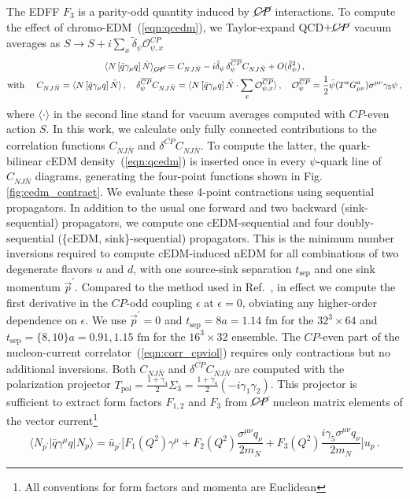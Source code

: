 \documentclass{PoS}
\newcommand{\CP}{{CP}}
\newcommand{\CPbar}{{\overline{CP}}}
\newcommand{\CPviol}{{\cancel{CP}}}
\newcommand{\mcO}{{\mathcal O}}
\begin{document}
The EDFF $F_3$ is a parity-odd quantity induced by $\CPviol$ interactions.
To compute the effect of chromo-EDM~(\ref{eqn:qcedm}), we Taylor-expand QCD$+\CPviol$ 
vacuum averages as
$S\to S + i\sum_x \tilde\delta_\psi \mcO^{\CPbar}_{\psi,x}$
\begin{gather}
\label{eqn:corr_cpviol}
\langle N\,[\bar q \gamma_\mu q]\, \bar N \rangle_{\CPviol}
  = C_{NJ\bar N} - i\tilde\delta_\psi \,\delta_\psi^\CPbar C_{NJ\bar N}
    + O(\tilde\delta_\psi^2)\,,
\\
\nonumber
\text{with }\quad
C_{NJ\bar N} = \langle N\,[\bar q \gamma_\mu q]\, \bar N\rangle\,,
\quad \delta_\psi^\CPbar C_{NJ\bar N} 
= \langle N\,[\bar q \gamma_\mu q]\, \bar{N} \cdot \sum_x\mcO^{\CPbar}_{\psi,x} \rangle\,,
\quad
\mcO_\psi^{\CPbar}  = \frac12\bar\psi (T^aG^a_{\mu\nu})\sigma^{\mu\nu}\gamma_5\psi\,,
\end{gather}
where $\langle\cdot\rangle$ in the second line stand for vacuum averages computed 
with $\CP$-even action $S$.
In this work, we calculate only fully connected contributions to the correlation 
functions $C_{N J \bar N}$ and $\delta^{\CPbar} C_{N J\bar N}$.
To compute the latter, the quark-bilinear cEDM density~(\ref{eqn:qcedm}) is inserted 
once in every $\psi$-quark line of $C_{N J\bar N}$ diagrams, generating the four-point functions 
shown in Fig.\ref{fig:cedm_contract}.
We evaluate these 4-point contractions using sequential propagators.
In addition to the usual one forward and two backward (sink-sequential) propagators, we compute 
one cEDM-sequential and four doubly-sequential (\{cEDM, sink\}-sequential) propagators.
This is the minimum number inversions required to compute cEDM-induced nEDM for all combinations 
of two degenerate flavors $u$ and $d$, with one source-sink separation $t_\text{sep}$ 
and one sink momentum $\vec p^\prime$. 
Compared to the method used in Ref.~\cite{Bhattacharya:2016oqm}, in effect we compute the first 
derivative in the $\CP$-odd coupling $\epsilon$ at $\epsilon=0$, obviating any higher-order 
dependence on $\epsilon$.
We use $\vec p^\prime=0$ and $t_\text{sep}=8a=1.14\text{ fm}$ for the $32^3\times64$ and
$t_\text{sep}=\{8,10\}a=0.91,1.15\text{ fm}$ for the $16^3\times32$ ensemble.
The $\CP$-even part of the nucleon-current correlator~(\ref{eqn:corr_cpviol})
requires only contractions but no additional inversions.
Both $C_{NJ\bar N}$ and $\delta^{\CPbar}C_{NJ\bar N}$ are computed with
the polarization projector 
$T_\text{pol}=\frac{1+\gamma_4}2\Sigma_3=\frac{1+\gamma_4}2(-i\gamma_1\gamma_2)$.
This projector is sufficient to extract form factors $F_{1,2}$ and $F_3$ 
from $\CPviol$ nucleon matrix elements of the vector current\footnote{
  All conventions for form factors and momenta are Euclidean}
\begin{equation}
\langle N_{p^\prime} | \bar{q}\gamma^\mu q | N_p\rangle
  = \bar{u}_{p^\prime} \big[ F_1(Q^2) \gamma^\mu
      + F_2(Q^2) \frac{\sigma^{\mu\nu} q_\nu}{2m_N}
      + F_3(Q^2) \frac{i\gamma_5\sigma^{\mu\nu} q_\nu}{2m_N}
      \big] u_p\,.
\end{equation}
\end{document}
